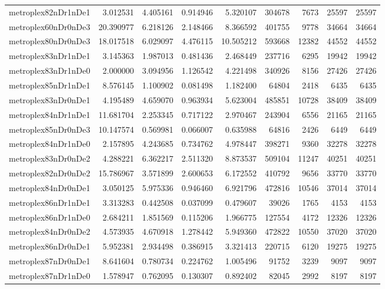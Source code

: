\begin{longtable}{|l|r|r|r|r|r|r|r|r|}
metroplex82nDr1nDe1 & 3.012531 & 4.405161 & 0.914946 & 5.320107 & 304678 & 7673 & 25597 & 25597 \\
metroplex60nDr0nDe3 & 20.390977 & 6.218126 & 2.148466 & 8.366592 & 401755 & 9778 & 34664 & 34664 \\
metroplex80nDr0nDe3 & 18.017518 & 6.029097 & 4.476115 & 10.505212 & 593668 & 12382 & 44552 & 44552 \\
metroplex83nDr1nDe1 & 3.145363 & 1.987013 & 0.481436 & 2.468449 & 237716 & 6295 & 19942 & 19942 \\
metroplex83nDr1nDe0 & 2.000000 & 3.094956 & 1.126542 & 4.221498 & 340926 & 8156 & 27426 & 27426 \\
metroplex85nDr1nDe1 & 8.576145 & 1.100902 & 0.081498 & 1.182400 & 64804 & 2418 & 6435 & 6435 \\
metroplex83nDr0nDe1 & 4.195489 & 4.659070 & 0.963934 & 5.623004 & 485851 & 10728 & 38409 & 38409 \\
metroplex84nDr1nDe1 & 11.681704 & 2.253345 & 0.717122 & 2.970467 & 243904 & 6556 & 21165 & 21165 \\
metroplex85nDr0nDe3 & 10.147574 & 0.569981 & 0.066007 & 0.635988 & 64816 & 2426 & 6449 & 6449 \\
metroplex84nDr1nDe0 & 2.157895 & 4.243685 & 0.734762 & 4.978447 & 398271 & 9360 & 32278 & 32278 \\
metroplex83nDr0nDe2 & 4.288221 & 6.362217 & 2.511320 & 8.873537 & 509104 & 11247 & 40251 & 40251 \\
metroplex82nDr0nDe2 & 15.786967 & 3.571899 & 2.600653 & 6.172552 & 410792 & 9656 & 33770 & 33770 \\
metroplex84nDr0nDe1 & 3.050125 & 5.975336 & 0.946460 & 6.921796 & 472816 & 10546 & 37014 & 37014 \\
metroplex86nDr1nDe1 & 3.313283 & 0.442508 & 0.037099 & 0.479607 & 39026 & 1765 & 4153 & 4153 \\
metroplex86nDr1nDe0 & 2.684211 & 1.851569 & 0.115206 & 1.966775 & 127554 & 4172 & 12326 & 12326 \\
metroplex84nDr0nDe2 & 4.573935 & 4.670918 & 1.278442 & 5.949360 & 472822 & 10550 & 37020 & 37020 \\
metroplex86nDr0nDe1 & 5.952381 & 2.934498 & 0.386915 & 3.321413 & 220715 & 6120 & 19275 & 19275 \\
metroplex87nDr0nDe1 & 8.641604 & 0.780734 & 0.224762 & 1.005496 & 91752 & 3239 & 9097 & 9097 \\
metroplex87nDr1nDe0 & 1.578947 & 0.762095 & 0.130307 & 0.892402 & 82045 & 2992 & 8197 & 8197 \\

\end{longtable}
